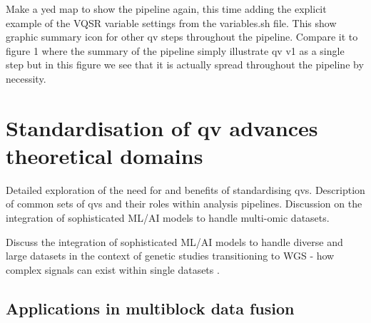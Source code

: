 Make a yed map to show the pipeline again, this time adding the explicit example of the VQSR variable settings from the variables.sh file.
This show graphic summary icon for other \ac{qv} steps throughout the pipeline.
Compare it to figure 1 where the summary of the pipeline simply illustrate \ac{qv} v1 as a single step but in this figure we see that it is actually spread throughout the pipeline by necessity. 






\section{Standardisation of \ac{qv} advances theoretical domains}
Detailed exploration of the need for and benefits of standardising \ac{qv}s. 
Description of common sets of \ac{qv}s and their roles within analysis pipelines. 
Discussion on the integration of sophisticated ML/AI models to handle multi-omic datasets.

Discuss the integration of sophisticated ML/AI models to handle diverse and large datasets in the context of genetic studies transitioning to WGS - how complex signals can exist within single datasets
\cite{kong2018nature, howe2021within}.

\subsection{Applications in multiblock data fusion} 

